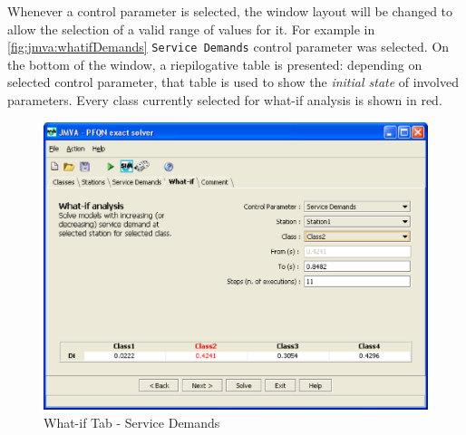 Whenever a control parameter is selected, the window layout will be
changed to allow the selection of a valid range of values for it.
For example in \autoref{fig:jmva:whatifDemands} \texttt{Service
Demands} control parameter was selected. On the bottom of the
window, a riepilogative table is presented: depending on selected
control parameter, that table is used to show the \emph{initial
state} of involved parameters. Every class currently selected for
what-if analysis is shown in red.

\begin{figure}[htbp]
    \begin{center}
        \includegraphics[scale=.5]{img/jmva/whatifDemands}
    \end{center}
    \caption{What-if Tab - Service Demands}
    \label{fig:jmva:whatifDemands}
\end{figure}

